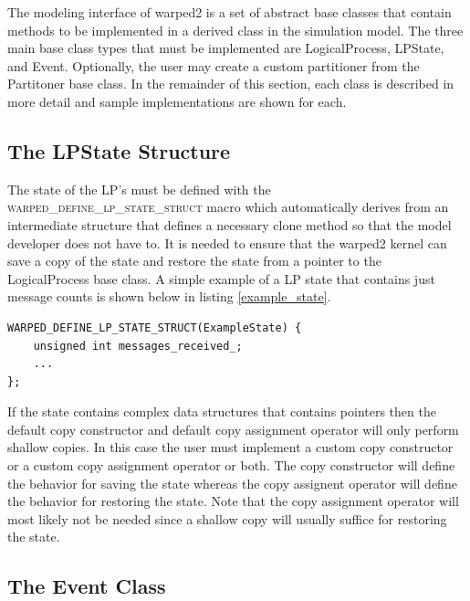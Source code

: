 \documentclass[11pt]{book}
\begin{document}
The modeling interface of warped2 is a set of abstract base classes that contain methods
to be implemented in a derived class in the simulation model. The three main base class
types that must be implemented are LogicalProcess, LPState, and Event. Optionally, the user
may create a custom partitioner from the Partitoner base class. In the remainder of this
section, each class is described in more detail and sample implementations are shown for each.

\subsection{The LPState Structure}

The state of the LP's must be defined with the \textsc{warped\_define\_lp\_state\_struct}
macro which automatically derives from an intermediate structure that defines a necessary
clone method so that the model developer does not have to. It is needed to ensure that the warped2
kernel can save a copy of the state and restore the state from a pointer to the LogicalProcess
base class. A simple example of a LP state that contains just message counts is shown below in
listing \ref{example_state}.

\begin{lstlisting}[caption=Example \textsc{warped2} State Definition, label=example_state, float]
WARPED_DEFINE_LP_STATE_STRUCT(ExampleState) {
    unsigned int messages_received_;
    ...
};
\end{lstlisting}

If the state contains complex data structures that contains pointers then the default copy
constructor and default copy assignment operator will only perform shallow copies. In this
case the user must implement a custom copy constructor or a custom copy assignment operator
or both. The copy constructor will define the behavior for saving the state whereas the
copy assignent operator will define the behavior for restoring the state. Note that the
copy assignment operator will most likely not be needed since a shallow copy will usually
suffice for restoring the state.

\subsection{The Event Class}
\end{document}

